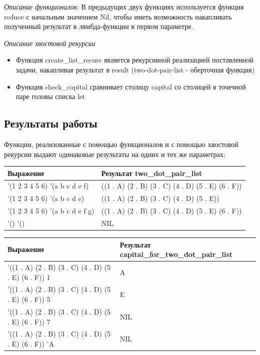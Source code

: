 \documentclass[a4paper,12pt]{article}
\begin{document}
 	\textit{Описание функционалов:}
 	В предыдущих двух функциях используется функция reduce с начальным значением Nil, чтобы иметь возможность накапливать полученный результат в лямбда-функции в первом параметре.
 
 	\textit{Описание хвостовой рекурсии}
 	\begin{itemize}
 		\item Функция create\_list\_recurs является рекурсивной реализацией поставленной задачи, накапливая результат в result (two-dot-pair-list - оберточная функция)
 		\item Функция check\_capital сравнивает столицу capital со столицей в точечной паре головы списка lst
 	\end{itemize}
 	
 	\subsection*{Результаты работы}
 	
 	 	Функции, реализованные с помощью функционалов и с помощью хвостовой рекурсии выдают одинаковые результаты на одних и тех же параметрах:
 	
 	
 	\begin{table} [h!]
 		\begin{center}
 			\begin{tabular}{|l|l|}
 				\hline
 				{\bf  Выражение} & {\bf Результат two\_dot\_pair\_list}\\
 				\hline
 				{'(1 2 3 4 5 6) '(a b c d e f)} & ((1 . A) (2 . B) (3 . C) (4 . D) (5 . E) (6 . F))\\
 				\hline
 				{'(1 2 3 4 5 6) '(a b c d e)} & ((1 . A) (2 . B) (3 . C) (4 . D) (5 . E))\\
 				\hline
 				{'(1 2 3 4 5 6) '(a b c d e f g)} & ((1 . A) (2 . B) (3 . C) (4 . D) (5 . E) (6 . F))\\
 				\hline
 				{'() '()} & NIL\\
 				\hline
 			\end{tabular}  
 			\label{m2}
 		\end{center}
 	\end{table}
 
 \begin{table} [h!]
 	\begin{center}
 		\begin{tabular}{|l|l|}
 			\hline
 			{\bf  Выражение} & {\bf Результат capital\_for\_two\_dot\_pair\_list}\\
 			\hline
 			{'((1 . A) (2 . B) (3 . C) (4 . D) (5 . E) (6 . F)) 1} & A\\
 			\hline
 			{'((1 . A) (2 . B) (3 . C) (4 . D) (5 . E) (6 . F)) 5} & E\\
 			\hline
 			{'((1 . A) (2 . B) (3 . C) (4 . D) (5 . E) (6 . F)) 7} & NIL\\
 			\hline
 			{'((1 . A) (2 . B) (3 . C) (4 . D) (5 . E) (6 . F)) 'A} & NIL\\
 			\hline
 		\end{tabular}  
 		\label{m2}
 	\end{center}
 \end{table}
\end{document}
